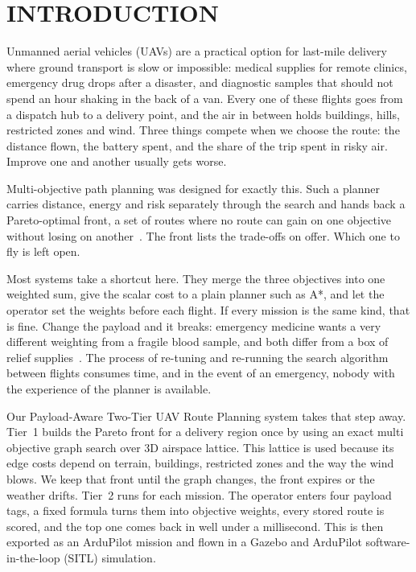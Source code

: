 
\chapter{INTRODUCTION}\label{cha:intro}

Unmanned aerial vehicles (UAVs) are a practical option for last-mile delivery where
ground transport is slow or impossible: medical supplies for remote clinics, emergency
drug drops after a disaster, and diagnostic samples that should not spend an hour
shaking in the back of a van. Every one of these flights goes from a dispatch hub to a
delivery point, and the air in between holds buildings, hills, restricted zones and
wind. Three things compete when we choose the route: the distance flown, the battery
spent, and the share of the trip spent in risky air. Improve one and another usually
gets worse.

Multi-objective path planning was designed for exactly this. Such a planner carries
distance, energy and risk separately through the search and hands back a Pareto-optimal
front, a set of routes where no route can gain on one objective without losing on
another~\cite{r11}. The front lists the trade-offs on offer. Which one to fly is left
open.

Most systems take a shortcut here. They merge the three objectives into one weighted
sum, give the scalar cost to a plain planner such as A*, and let the operator set the
weights before each flight. If every mission is the same kind, that is fine. Change the
payload and it breaks: emergency medicine wants a very different weighting from a
fragile blood sample, and both differ from a box of relief supplies~\cite{r1}.
The process of re-tuning and re-running the search algorithm between flights consumes
time, and in the event of an emergency, nobody with the experience of the planner is
available.

Our Payload-Aware Two-Tier UAV Route Planning system takes that step away. Tier~1
builds the Pareto front for a delivery region once by using an exact multi objective
graph search over 3D airspace lattice. This lattice is used because its edge costs
depend on terrain, buildings, restricted zones and the way the wind blows. We keep that front until the
graph changes, the front expires or the weather drifts. Tier~2 runs for each mission.
The operator enters four payload tags, a fixed formula turns them into objective
weights, every stored route is scored, and the top one comes back in well under a
millisecond. This is then exported as an ArduPilot mission and flown in a Gazebo and
ArduPilot software-in-the-loop (SITL) simulation.

